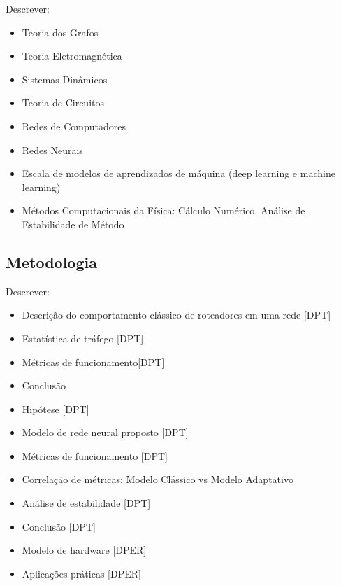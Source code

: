 \documentclass[12pt,a4paper]{article}
\begin{document}
Descrever:

\begin{itemize}

    \item Teoria dos Grafos
    \item Teoria Eletromagnética
    \item Sistemas Dinâmicos
    \item Teoria de Circuitos
    \item Redes de Computadores
    \item Redes Neurais
    \item Escala de modelos de aprendizados de máquina (deep learning e machine learning)
    \item Métodos Computacionais da Física: Cálculo Numérico, Análise de Estabilidade de Método




\end{itemize}

\vspace{0.5cm}

\subsection{Metodologia}

Descrever:
\begin{itemize}

    \item Descrição do comportamento clássico de roteadores em uma rede [DPT]
    \item Estatística de tráfego [DPT]
    \item Métricas de funcionamento[DPT]
    \item Conclusão
    \item Hipótese [DPT]%
    \item Modelo de rede neural proposto [DPT]
    \item Métricas de funcionamento [DPT]
    \item Correlação de métricas: Modelo Clássico vs Modelo Adaptativo
    \item Análise de estabilidade [DPT]
    \item Conclusão [DPT]
    \item Modelo de hardware [DPER]
    \item Aplicações práticas [DPER]

\end{itemize}
\end{document}
